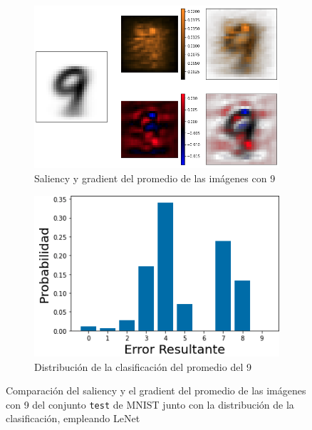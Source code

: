 \begin{figure}[h!]
    \centering
    \begin{subfigure}[b]{0.47\textwidth}
        \centering
        \includegraphics[width=\textwidth]{images/saliency/mnist/linear/9_saliency_figures.png}
        \caption{Saliency y gradient del promedio de las imágenes con 9}
        \label{9_saliency}
    \end{subfigure}
    \hfill
    \begin{subfigure}[b]{0.47\textwidth}
        \centering
        \includegraphics[width=\textwidth]{images/saliency/mnist/linear/9_error.png}
        \caption{Distribución de la clasificación del promedio del 9}
        \label{9_error}
    \end{subfigure}
    \caption{Comparación del saliency y el gradient del promedio de las imágenes con 9 del conjunto \texttt{test} de MNIST junto con la distribución de la clasificación, empleando LeNet}
    \label{9_SAL}
\end{figure}

